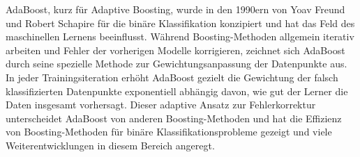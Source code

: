AdaBoost, kurz für \glqq Adaptive Boosting\grqq, wurde in den 1990ern von Yoav Freund und Robert Schapire für die binäre
Klassifikation konzipiert und hat das Feld des maschinellen Lernens beeinflusst. Während Boosting-Methoden
allgemein iterativ arbeiten und Fehler der vorherigen Modelle korrigieren, zeichnet sich AdaBoost durch seine spezielle
Methode zur Gewichtungsanpassung der Datenpunkte aus. In jeder Trainingsiteration erhöht AdaBoost gezielt die Gewichtung
der falsch klassifizierten Datenpunkte exponentiell abhängig davon, wie gut der Lerner die Daten insgesamt vorhersagt.
Dieser adaptive Ansatz zur Fehlerkorrektur unterscheidet AdaBoost von anderen Boosting-Methoden und hat die Effizienz von
Boosting-Methoden für binäre Klassifikationsprobleme gezeigt und viele
Weiterentwicklungen in diesem Bereich angeregt. \cite{WuKumar2009}